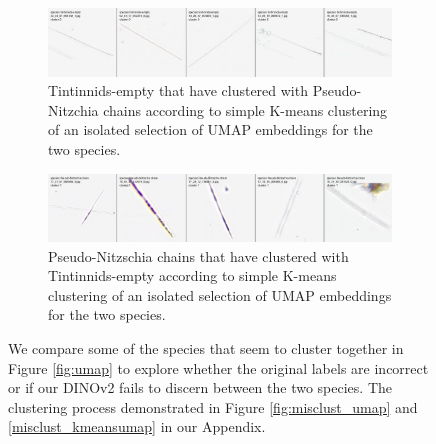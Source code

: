 \begin{figure}[H]
    \centering
    \begin{subfigure}[b]{1\linewidth}
        \includegraphics[width=\linewidth]{examples/tests_eb/figs/misclustered_empty.png}
        \caption{Tintinnids-empty that have clustered with Pseudo-Nitzchia chains according to simple K-means clustering of an isolated selection of UMAP embeddings for the two species.}
    \end{subfigure}
    
    \vspace{1em}
    
    \begin{subfigure}[b]{1\linewidth}
        \includegraphics[width=\linewidth]{examples/tests_eb/figs/misclustered_pseudo-nitz.png}
        \caption{Pseudo-Nitzschia chains that have clustered with Tintinnids-empty according to simple K-means clustering of an isolated selection of UMAP embeddings for the two species.}
    \end{subfigure}
    \caption{We compare some of the species that seem to cluster together in Figure \ref{fig:umap} to explore whether the original labels are incorrect or if our DINOv2 fails to discern between the two species. The clustering process demonstrated in Figure \ref{fig:misclust_umap} and \ref{misclust_kmeansumap} in our Appendix.}
\end{figure}


